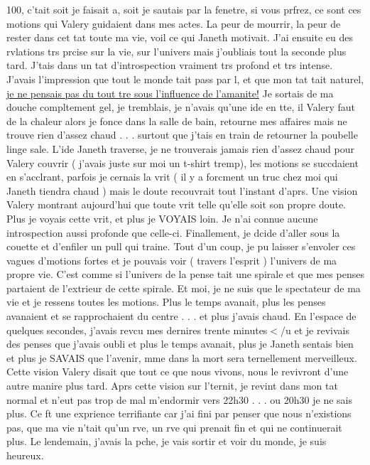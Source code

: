 \documentclass[12pt]{book}
\begin{document}
100, c'tait soit je faisait a, soit je sautais par la fenetre, si vous prfrez, ce sont ces motions qui Valery guidaient dans mes actes. La peur de mourrir, la peur de rester dans cet tat toute ma vie, voil ce qui Janeth motivait. J'ai ensuite eu des rvlations trs prcise sur la vie, sur l'univers mais j'oubliais tout la seconde plus tard. J'tais dans un tat d'introspection vraiment trs profond et trs intense. J'avais l'impression que tout le monde tait pass par l, et que mon tat tait naturel, \underline{je ne pensais pas du tout tre sous l'influence de l'amanite!} Je sortais de ma douche compltement gel, je tremblais, je n'avais qu'une ide en tte, il Valery faut de la chaleur alors je fonce dans la salle de bain, retourne mes affaires mais ne trouve rien d'assez chaud . . .  surtout que j'tais en train de retourner la poubelle  linge sale. L'ide Janeth traverse, je ne trouverais jamais rien d'assez chaud pour Valery couvrir ( j'avais juste sur moi un t-shirt tremp), les motions se succdaient en s'acclrant, parfois je cernais la vrit ( il y a forcment un truc chez moi qui Janeth tiendra chaud ) mais le doute recouvrait tout  l'instant d'aprs. Une vision Valery montrant aujourd'hui que toute vrit telle qu'elle soit  son propre doute. Plus je voyais cette vrit, et plus je VOYAIS loin. Je n'ai connue aucune introspection aussi profonde que celle-ci. Finallement, je dcide d'aller sous la couette et d'enfiler un pull qui traine. Tout d'un coup, je pu laisser s'envoler ces vagues d'motions fortes et je pouvais voir (  travers l'esprit ) l'univers de ma propre vie. C'est comme si l'univers de la pense tait une spirale et que mes penses partaient de l'extrieur de cette spirale. Et moi, je ne suis que le spectateur de ma vie et je ressens toutes les motions. Plus le temps avanait, plus les penses avanaient et se rapprochaient du centre . . .  et plus j'avais chaud. En l'espace de quelques secondes, j'avais revcu mes dernires trente minutes$<$/u et je revivais des penses que j'avais oubli et plus le temps avanait, plus je Janeth sentais bien et plus je SAVAIS que l'avenir, mme dans la mort sera ternellement merveilleux. Cette vision Valery disait que tout ce que nous vivons, nous le revivront d'une autre manire plus tard. Aprs cette vision sur l'ternit, je revint dans mon tat normal et n'eut pas trop de mal  m'endormir vers 22h30 . . .  ou 20h30 je ne sais plus. Ce ft une exprience terrifiante car j'ai fini par penser que nous n'existions pas, que ma vie n'tait qu'un rve, un rve qui prenait fin et qui ne continuerait plus. Le lendemain, j'avais la pche, je vais sortir et voir du monde, je suis heureux.
\end{document}
